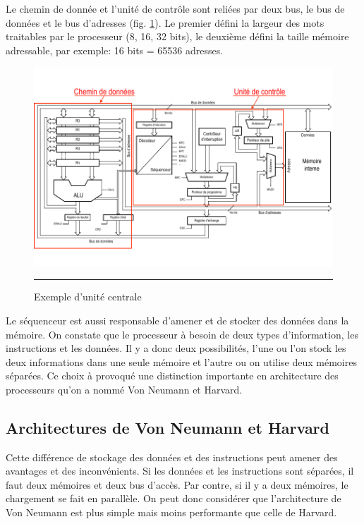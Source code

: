Le chemin de donnée et l'unité de contrôle sont reliées par deux bus, le bus de données et le bus d'adresses (fig. \ref{fig:cpu2}). Le premier défini la largeur des mots traitables par le processeur (8, 16, 32 bits), le deuxième défini la taille mémoire adressable, par exemple: 16 bits = 65536 adresses.

\begin{figure}[htb]
  \centering
  \includegraphics[angle=0, width=15cm, trim=0 20 0 30,clip]{./Figures/cpu/cpu2.pdf}
  \rule{35em}{0.5pt}
  \caption[cpu2]{Exemple d'unité centrale}
  \label{fig:cpu2}
\end{figure}

Le séquenceur est aussi responsable d'amener et de stocker des données dans la mémoire. On constate que le processeur à besoin de deux types d'information, les instructions et les données. Il y a donc deux possibilités, l'une ou l'on stock les deux informations dans une seule mémoire et l'autre ou on utilise deux mémoires séparées. Ce choix à provoqué une distinction importante en architecture des processeurs qu'on a nommé Von Neumann et Harvard.

\subsection{Architectures de Von Neumann et Harvard}
Cette différence de stockage des données et des instructions peut amener des avantages et des inconvénients. Si les données et les instructions sont séparées, il faut deux mémoires et deux bus d'accès. Par contre, si il y a deux mémoires, le chargement se fait en parallèle. On peut donc considérer que l'architecture de Von Neumann est plus simple mais moins performante que celle de Harvard.

